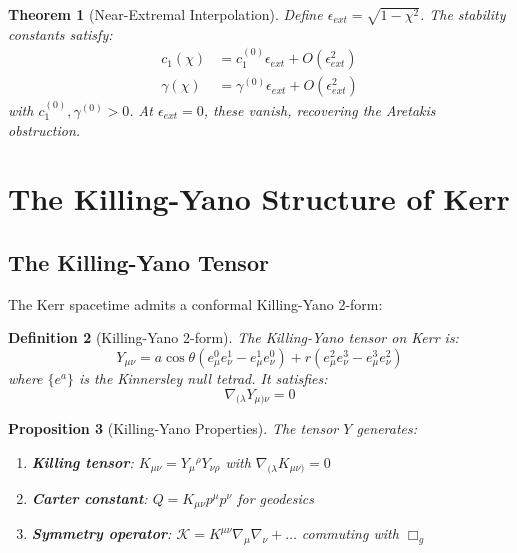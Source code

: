 \documentclass[12pt,a4paper]{article}
\newtheorem{theorem}{Theorem}[section]
\newtheorem{proposition}[theorem]{Proposition}
\newtheorem{definition}[theorem]{Definition}
\begin{document}
\begin{theorem}[Near-Extremal Interpolation]\label{thm:interpolation}
Define $\epsilon_{ext} = \sqrt{1-\chi^2}$. The stability constants satisfy:
\begin{align}
c_1(\chi) &= c_1^{(0)}\epsilon_{ext} + O(\epsilon_{ext}^2) \\
\gamma(\chi) &= \gamma^{(0)}\epsilon_{ext} + O(\epsilon_{ext}^2)
\end{align}
with $c_1^{(0)}, \gamma^{(0)} > 0$. At $\epsilon_{ext} = 0$, these vanish, recovering the Aretakis obstruction.
\end{theorem}

\section{The Killing-Yano Structure of Kerr}

\subsection{The Killing-Yano Tensor}

The Kerr spacetime admits a conformal Killing-Yano 2-form:

\begin{definition}[Killing-Yano 2-form]
The Killing-Yano tensor on Kerr is:
\begin{equation}
Y_{\mu\nu} = a\cos\theta (e^0_\mu e^1_\nu - e^1_\mu e^0_\nu) + r(e^2_\mu e^3_\nu - e^3_\mu e^2_\nu)
\end{equation}
where $\{e^a\}$ is the Kinnersley null tetrad. It satisfies:
\begin{equation}
\nabla_{(\lambda}Y_{\mu)\nu} = 0
\end{equation}
\end{definition}

\begin{proposition}[Killing-Yano Properties]
The tensor $Y$ generates:
\begin{enumerate}[label=(\roman*)]
    \item \textbf{Killing tensor}: $K_{\mu\nu} = Y_\mu{}^\rho Y_{\nu\rho}$ with $\nabla_{(\lambda}K_{\mu\nu)} = 0$
    \item \textbf{Carter constant}: $Q = K_{\mu\nu}p^\mu p^\nu$ for geodesics
    \item \textbf{Symmetry operator}: $\mathcal{K} = K^{\mu\nu}\nabla_\mu\nabla_\nu + \ldots$ commuting with $\Box_g$
\end{enumerate}
\end{proposition}
\end{document}
